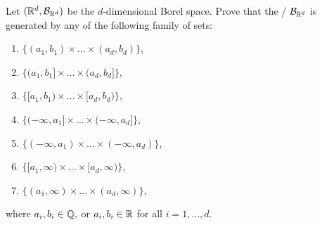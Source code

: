 \begin{problem}
Let $(\mathbb R^d, \mathcal B_{\mathbb R^d})$ be the $d$-dimensional Borel space. Prove that the \sigalg/ $\mathcal B_{\mathbb R^d}$ is generated by any of the following family of sets:
\begin{enumerate}[label={(\alph*)}]
\item $\{(a_1, b_1) \times \dots \times (a_d,b_d)\}$,
\item $\{(a_1, b_1] \times \dots \times (a_d,b_d]\}$,
\item $\{[a_1, b_1) \times \dots \times [a_d,b_d)\}$,
\item $\{(-\infty,a_1] \times \dots \times (-\infty,a_d]\}$,
\item $\{(-\infty,a_1) \times \dots \times (-\infty, a_d)\}$,
\item $\{[a_1, \infty) \times \dots \times [a_d, \infty)\}$,
\item $\{(a_1,\infty) \times \dots \times (a_d, \infty)\}$,
\end{enumerate}
where $a_i, b_i \in \mathbb Q,$ or $a_i, b_i \in \mathbb R$ for all $i = 1, \dots, d$.
\end{problem}

